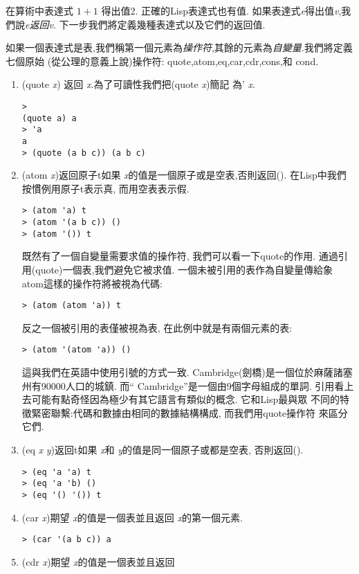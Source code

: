 \documentclass[12pt,a4]{article}
\begin{document}
\begin{CJK}{UTF8}{bsmi}
在算術中表達式 $1 + 1$ 得出值2. 
正確的Lisp表達式也有值. 
如果表達式{\it e}得出值{\it v},我們說{\it e}{\em 返回}{\it v}. 
下一步我們將定義幾種表達式以及它們的返回值. 

如果一個表達式是表,我們稱第一個元素為{\em 操作符},其餘的元素為{\em 自變量}.我們將定義七個原始
(從公理的意義上說)操作符: 
quote,atom,eq,car,cdr,cons,和 cond. 

\begin{enumerate} 
\item 
(quote 
{\it 
x}) 
返回{\it 
x}.為了可讀性我們把(quote 
{\it 
x})簡記 
為'{\it 
x}. 

\begin{verbatim} 
> 
(quote a) a 
> 'a 
a 
> (quote (a b c)) (a b c) 
\end{verbatim} 
\item 
(atom 
{\it 
x})返回原子t如果{\it 
x}的值是一個原子或是空表,否則返回(). 
在Lisp中我們 
按慣例用原子t表示真, 
而用空表表示假. 
\begin{verbatim} 
> (atom 'a) t 
> (atom '(a b c)) () 
> (atom '()) t 
\end{verbatim} 
既然有了一個自變量需要求值的操作符, 
我們可以看一下quote的作用. 
通過引 
用(quote)一個表,我們避免它被求值. 
一個未被引用的表作為自變量傳給象 
atom這樣的操作符將被視為代碼: 
\begin{verbatim} 
> (atom (atom 'a)) t 
\end{verbatim} 
反之一個被引用的表僅被視為表, 
在此例中就是有兩個元素的表: 
\begin{verbatim} 
> (atom '(atom 'a)) () 
\end{verbatim} 
這與我們在英語中使用引號的方式一致. 
{\rm 
Cambridge}(劍橋)是一個位於麻薩諸塞 
州有90000人口的城鎮. 
而``{\rm 
Cambridge}''是一個由9個字母組成的單詞. 
引用看上去可能有點奇怪因為極少有其它語言有類似的概念. 
它和Lisp最與眾 
不同的特徵緊密聯繫:代碼和數據由相同的數據結構構成, 
而我們用quote操作符 
來區分它們. 
\item 
(eq 
{\it 
x} 
{\it 
y})返回t如果{\it 
x}和{\it 
y}的值是同一個原子或都是空表, 
否則返回(). 
\begin{verbatim} 
> (eq 'a 'a) t 
> (eq 'a 'b) () 
> (eq '() '()) t 
\end{verbatim} 
\item 
(car 
{\it 
x})期望{\it 
x}的值是一個表並且返回{\it 
x}的第一個元素. 
\begin{verbatim} 
> (car '(a b c)) a 
\end{verbatim} 
\item 
(cdr 
{\it 
x})期望{\it 
x}的值是一個表並且返回{\it 
}
\end{enumerate}
\end{CJK}
\end{document}
